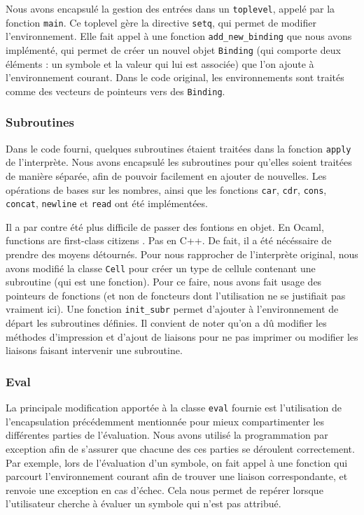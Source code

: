 \documentclass[a4paper,11pt]{article}
\begin{document}
  Nous avons encapsulé la gestion des entrées dans un \texttt{toplevel}, 
 appelé par la fonction \texttt{main}. Ce toplevel gère la directive \texttt{setq}, qui
 permet de modifier l'environnement. 
 Elle fait appel à une fonction \texttt{add\_new\_binding} que nous avons
 implémenté, qui permet de créer un nouvel objet
  \texttt{Binding} (qui comporte deux éléments : un
 symbole et la valeur qui lui est associée) que l'on ajoute à l'environnement courant. 
 Dans le code original, les environnements sont traités comme des vecteurs de pointeurs 
 vers des
 \texttt{Binding}.

 \subsubsection{Subroutines}
 
  Dans le code fourni, quelques subroutines étaient traitées dans la fonction 
  \texttt{apply} de l'interprète. Nous avons encapsulé les subroutines pour qu'elles soient 
  traitées de manière séparée, afin de pouvoir facilement en ajouter de nouvelles. 
  Les opérations de bases sur les nombres, ainsi que les fonctions \texttt{car}, 
  \texttt{cdr}, \texttt{cons}, \texttt{concat}, \texttt{newline} et \texttt{read} 
  ont été implémentées.

  Il a par contre été plus difficile de passer des fontions en objet. En Ocaml,
  \og functions are first-class citizens \fg. Pas en C++. De fait, il a été
  nécéssaire de prendre des moyens détournés.
  Pour nous rapprocher de l'interprète original, nous avons modifié la classe
  \texttt{Cell} pour créer un type de cellule contenant une subroutine (qui est
  une fonction). Pour ce faire, nous avons fait usage des pointeurs de fonctions
  (et non de foncteurs dont l'utilisation ne se justifiait pas vraiment ici).
  Une fonction \texttt{init\_subr} permet d'ajouter à l'environnement de départ
  les subroutines définies. Il convient de noter qu'on a dû modifier les
  méthodes d'impression et d'ajout de liaisons pour ne pas imprimer ou modifier 
  les liaisons faisant
  intervenir une subroutine.
  
 \subsubsection{Eval}
 
 La principale modification apportée à la classe \texttt{eval} fournie est 
l'utilisation de l'encapsulation précédemment mentionnée pour mieux compartimenter 
les différentes parties de l'évaluation. Nous avons utilisé la programmation 
par exception afin de s'assurer que chacune des ces parties se déroulent 
correctement. Par exemple, lors de l'évaluation d'un symbole, on fait appel 
à une fonction qui parcourt l'environnement courant afin de trouver une liaison 
correspondante, et renvoie une exception en cas d'échec. Cela nous permet de 
repérer lorsque l'utilisateur cherche à évaluer un symbole qui n'est pas attribué.
\end{document}
